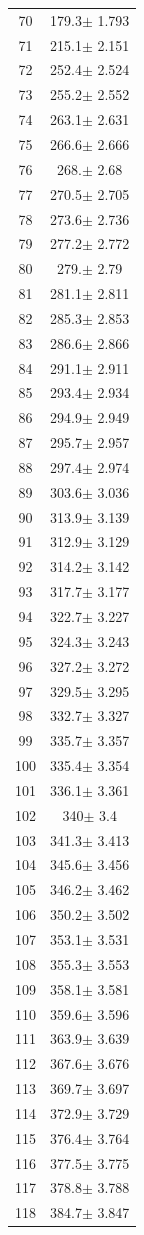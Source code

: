 \documentclass[a4paper]{instrumentacao}
\begin{document}
\begin{longtable}{cc}
 70 & 179.3$\pm$ 1.793 \\
 71 & 215.1$\pm$ 2.151 \\
 72 & 252.4$\pm$ 2.524 \\
 73 & 255.2$\pm$ 2.552 \\
 74 & 263.1$\pm$ 2.631 \\
 75 & 266.6$\pm$ 2.666 \\
 76 & 268.$\pm$ 2.68 \\
 77 & 270.5$\pm$ 2.705 \\
 78 & 273.6$\pm$ 2.736 \\
 79 & 277.2$\pm$ 2.772 \\
 80 & 279.$\pm$ 2.79 \\
 81 & 281.1$\pm$ 2.811 \\
 82 & 285.3$\pm$ 2.853 \\
 83 & 286.6$\pm$ 2.866 \\
 84 & 291.1$\pm$ 2.911 \\
 85 & 293.4$\pm$ 2.934 \\
 86 & 294.9$\pm$ 2.949 \\
 87 & 295.7$\pm$ 2.957 \\
 88 & 297.4$\pm$ 2.974 \\
 89 & 303.6$\pm$ 3.036 \\
 90 & 313.9$\pm$ 3.139 \\
 91 & 312.9$\pm$ 3.129 \\
 92 & 314.2$\pm$ 3.142 \\
 93 & 317.7$\pm$ 3.177 \\
 94 & 322.7$\pm$ 3.227 \\
 95 & 324.3$\pm$ 3.243 \\
 96 & 327.2$\pm$ 3.272 \\
 97 & 329.5$\pm$ 3.295 \\
 98 & 332.7$\pm$ 3.327 \\
 99 & 335.7$\pm$ 3.357 \\
 100 & 335.4$\pm$ 3.354 \\
 101 & 336.1$\pm$ 3.361 \\
 102 & 340$\pm$ 3.4 \\
 103 & 341.3$\pm$ 3.413 \\
 104 & 345.6$\pm$ 3.456 \\
 105 & 346.2$\pm$ 3.462 \\
 106 & 350.2$\pm$ 3.502 \\
 107 & 353.1$\pm$ 3.531 \\
 108 & 355.3$\pm$ 3.553 \\
 109 & 358.1$\pm$ 3.581 \\
 110 & 359.6$\pm$ 3.596 \\
 111 & 363.9$\pm$ 3.639 \\
 112 & 367.6$\pm$ 3.676 \\
 113 & 369.7$\pm$ 3.697 \\
 114 & 372.9$\pm$ 3.729 \\
 115 & 376.4$\pm$ 3.764 \\
 116 & 377.5$\pm$ 3.775 \\
 117 & 378.8$\pm$ 3.788 \\
 118 & 384.7$\pm$ 3.847 \\
\end{longtable}
\end{document}
